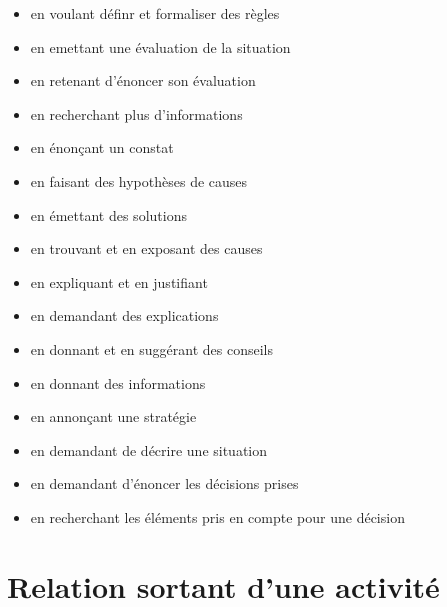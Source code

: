 \documentclass[8pt,a4paper]{article}
\begin{document}
\begin{itemize}
\begin{itemize}
\item en voulant définr et formaliser des règles  
\item en emettant une évaluation de la situation  
\item en retenant d'énoncer son évaluation  
\item en recherchant plus d'informations  
\item en énonçant un constat
\item en faisant des hypothèses de causes
\item en émettant des solutions
\item en trouvant et en exposant des causes  
\item en expliquant et en justifiant
\item en demandant des explications
\item en donnant et en suggérant des conseils  
\item en donnant des informations
\item en annonçant une stratégie  
\item en demandant de décrire une situation  
\item en demandant d'énoncer les décisions prises  
\item en recherchant les éléments pris en compte pour une décision
\\ 
 \end{itemize}
\end{itemize}
\section{Relation sortant d'une activité}
\end{document}
